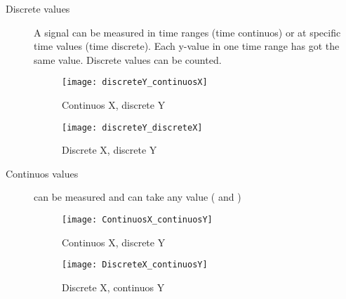 \begin{description}
\begin{figure}[!h]
			\label{fig:timecontinuos}
		\end{figure}
	\item[Discrete values] A signal can be measured in time ranges (time continuos)  or at specific time values (time discrete). Each y-value in one time range has got the same value. Discrete values can be counted.
		\begin{figure}[!h]
			\centering
			\texttt{[image: discreteY\_continuosX]}
			\caption[Continuos X, discrete Y]{Continuos X, discrete Y}
			\label{fig:discreteY_continuosX}
		\end{figure}
		
		\begin{figure}[!h]
			\centering
			\texttt{[image: discreteY\_discreteX]}
			\caption[Discrete X, discrete Y]{Discrete X, discrete Y}
			\label{fig:discreteY_discreteX}
		\end{figure}

	\item[Continuos values] can be measured and can take any value ( and )
		\begin{figure}[!h]
			\centering
			\texttt{[image: ContinuosX\_continuosY]}
			\caption{Continuos X, discrete Y}
			\label{fig:ContinuosX_continuosY}
		\end{figure}
		
		\begin{figure}[!h]
			\centering
			\texttt{[image: DiscreteX\_continuosY]}
			\caption{Discrete X, continuos Y}
			\label{fig:DiscreteX_continuosY}
		\end{figure}
		

\end{description}
